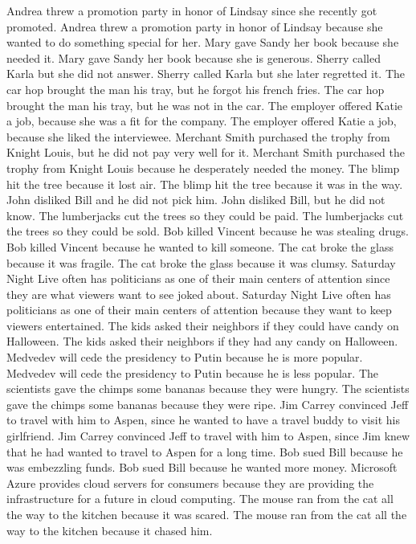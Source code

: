 \documentclass{article}
\begin{document}
\begin{enumerate}
Andrea threw a promotion party in honor of Lindsay since she recently got promoted.
Andrea threw a promotion party in honor of Lindsay because she wanted to do something special for her.
Mary gave Sandy her book because she needed it.
Mary gave Sandy her book because she is generous.
Sherry called Karla but she did not answer.
Sherry called Karla but she later regretted it.
The car hop brought the man his tray, but he forgot his french fries.
The car hop brought the man his tray, but he was not in the car.
The employer offered Katie a job, because she was a fit for the company.
The employer offered Katie a job, because she liked the interviewee.
Merchant Smith purchased the trophy from Knight Louis, but he did not pay very well for it.
Merchant Smith purchased the trophy from Knight Louis because he desperately needed the money.
The blimp hit the tree because it lost air.
The blimp hit the tree because it was in the way.
John disliked Bill and he did not pick him.
John disliked Bill, but he did not know.
The lumberjacks cut the trees so they could be paid.
The lumberjacks cut the trees so they could be sold.
Bob killed Vincent because he was stealing drugs.
Bob killed Vincent because he wanted to kill someone.
The cat broke the glass because it was fragile.
The cat broke the glass because it was clumsy.
Saturday Night Live often has politicians as one of their main centers of attention since they are what viewers want to see joked about.
Saturday Night Live often has politicians as one of their main centers of attention because they want to keep viewers entertained.
The kids asked their neighbors if they could have candy on Halloween.
The kids asked their neighbors if they had any candy on Halloween.
Medvedev will cede the presidency to Putin because he is more popular.
Medvedev will cede the presidency to Putin because he is less popular.
The scientists gave the chimps some bananas because they were hungry.
The scientists gave the chimps some bananas because they were ripe.
Jim Carrey convinced Jeff to travel with him to Aspen, since he wanted to have a travel buddy to visit his girlfriend.
Jim Carrey convinced Jeff to travel with him to Aspen, since Jim knew that he had wanted to travel to Aspen for a long time.
Bob sued Bill because he was embezzling funds.
Bob sued Bill because he wanted more money.
Microsoft Azure provides cloud servers for consumers because they are providing the infrastructure for a future in cloud computing.
The mouse ran from the cat all the way to the kitchen because it was scared.
The mouse ran from the cat all the way to the kitchen because it chased him.

\end{enumerate}
\end{document}
